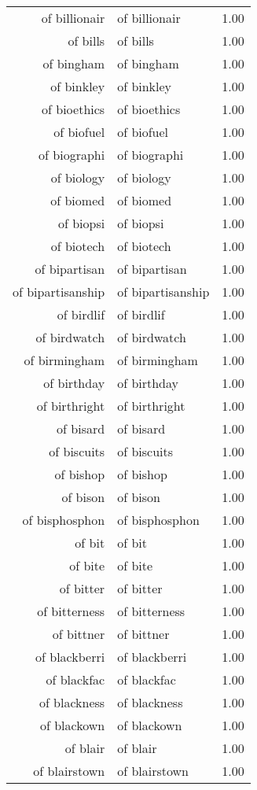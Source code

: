 \begin{table}[ht]
\begin{tabular}{rlr}
  of billionair & of billionair & 1.00 \\ 
  of bills & of bills & 1.00 \\ 
  of bingham & of bingham & 1.00 \\ 
  of binkley & of binkley & 1.00 \\ 
  of bioethics & of bioethics & 1.00 \\ 
  of biofuel & of biofuel & 1.00 \\ 
  of biographi & of biographi & 1.00 \\ 
  of biology & of biology & 1.00 \\ 
  of biomed & of biomed & 1.00 \\ 
  of biopsi & of biopsi & 1.00 \\ 
  of biotech & of biotech & 1.00 \\ 
  of bipartisan & of bipartisan & 1.00 \\ 
  of bipartisanship & of bipartisanship & 1.00 \\ 
  of birdlif & of birdlif & 1.00 \\ 
  of birdwatch & of birdwatch & 1.00 \\ 
  of birmingham & of birmingham & 1.00 \\ 
  of birthday & of birthday & 1.00 \\ 
  of birthright & of birthright & 1.00 \\ 
  of bisard & of bisard & 1.00 \\ 
  of biscuits & of biscuits & 1.00 \\ 
  of bishop & of bishop & 1.00 \\ 
  of bison & of bison & 1.00 \\ 
  of bisphosphon & of bisphosphon & 1.00 \\ 
  of bit & of bit & 1.00 \\ 
  of bite & of bite & 1.00 \\ 
  of bitter & of bitter & 1.00 \\ 
  of bitterness & of bitterness & 1.00 \\ 
  of bittner & of bittner & 1.00 \\ 
  of blackberri & of blackberri & 1.00 \\ 
  of blackfac & of blackfac & 1.00 \\ 
  of blackness & of blackness & 1.00 \\ 
  of blackown & of blackown & 1.00 \\ 
  of blair & of blair & 1.00 \\ 
  of blairstown & of blairstown & 1.00 \\ 

\end{tabular}
\end{table}
